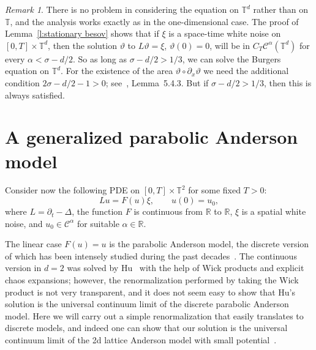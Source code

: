 \documentclass[a4paper,11pt]{article}
\theoremstyle{remark}
\newtheorem{remark}[theorem]{Remark}
\newcommand{\R}{\mathbb{R}}
\newcommand{\CC}{\ensuremath{\mathscr{C}}}
\newcommand{\reso}{\,\mathord{\circ}\,}
\begin{document}
\begin{remark}
   There is no problem in considering the equation on $\mathbb{T}^d$ rather than on $\mathbb{T}$, %
   and the analysis works exactly as in the one-dimensional case. The proof of Lemma~\ref{l:stationary besov} shows that if $\xi$ is a space-time white noise on $[0,T] \times \mathbb{T}^d$, then the solution $\vartheta$ to $L \vartheta = \xi$, $\vartheta(0) = 0$, will be in $C_T\CC^\alpha(\mathbb{T}^d)$ for every $\alpha < \sigma - d/2$. So as long as $\sigma - d/2 > 1/3$, we can solve the Burgers equation on $\mathbb{T}^d$. For the existence of the area $\vartheta \reso \partial_x \vartheta$ we need the additional condition $2 \sigma - d/2 - 1 > 0$; see~\cite{Perkowski2014Thesis}, Lemma~5.4.3. But if $\sigma - d/2 > 1/3$, then this is always satisfied. 
\end{remark}



\section{A generalized parabolic Anderson model}\label{sec:PAM}

Consider now the following PDE on $[ 0,T ] \times \mathbb{T}^{2}$ for some fixed $T>0$:
\begin{equation}\label{eq:pam}
  L u=F ( u ) \xi, \qquad u(0) = u_0,
\end{equation}
where $L = \partial_{t} - \Delta$, the function $F$ is continuous from
$\mathbb{R}$ to $\mathbb{R}$, $\xi$ is a spatial white noise, and $u_0 \in \CC^\alpha$ for suitable $\alpha \in \R$.

The linear case $F(u) = u$ is the parabolic Anderson model, the discrete version of which has been intensely studied during the past decades~\cite{Carmona1994,Koenig2015}. The continuous version in $d=2$ was solved by Hu~\cite{Hu2002} with the help of Wick products and explicit chaos expansions; however, the renormalization performed by taking the Wick product is not very transparent, and it does not seem easy to show that Hu's solution is the universal continuum limit of the discrete parabolic Anderson model. Here we will carry out a simple renormalization that easily translates to discrete models, and indeed one can show that our solution is the universal continuum limit of the 2d lattice Anderson model with small potential~\cite{Chouk2015}.
\end{document}

